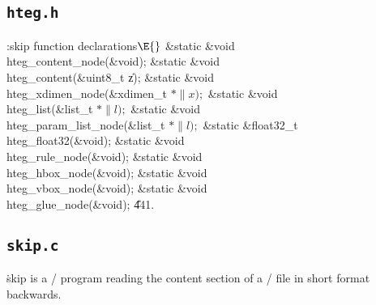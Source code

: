 \subsection{{\tt hteg.h}}
\noindent
\Y\B\4:skip function declarations\X${}\E{}$\6
\&{static} \&{void} \\{hteg\_content\_node}(\&{void});\6
\&{static} \&{void} \\{hteg\_content}(\&{uint8\_t} \|z);\6
\&{static} \&{void} \\{hteg\_xdimen\_node}(\&{xdimen\_t} ${}{*}\|x);{}$\6
\&{static} \&{void} \\{hteg\_list}(\&{list\_t} ${}{*}\|l);{}$\6
\&{static} \&{void} \\{hteg\_param\_list\_node}(\&{list\_t} ${}{*}\|l);{}$\6
\&{static} \&{float32\_t} \\{hteg\_float32}(\&{void});\6
\&{static} \&{void} \\{hteg\_rule\_node}(\&{void});\6
\&{static} \&{void} \\{hteg\_hbox\_node}(\&{void});\6
\&{static} \&{void} \\{hteg\_vbox\_node}(\&{void});\6
\&{static} \&{void} \\{hteg\_glue\_node}(\&{void});
\U441.\Y
\fi


\subsection{{\tt skip.c}}\label{skip}
\.{skip} is a \CEE/ program reading the content section of a \HINT/ file in short format
backwards.

